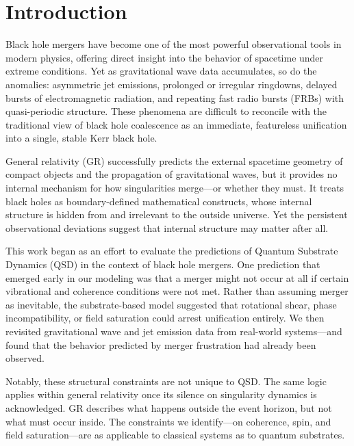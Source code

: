 \documentclass[sn-mathphys]{sn-jnl}
\theoremstyle{thmstyleone}%
\theoremstyle{thmstyletwo}%
\theoremstyle{thmstylethree}%
\begin{document}
\section{Introduction}
Black hole mergers have become one of the most powerful observational tools in modern physics, offering direct insight into the behavior of spacetime under extreme conditions. Yet as gravitational wave data accumulates, so do the anomalies: asymmetric jet emissions, prolonged or irregular ringdowns, delayed bursts of electromagnetic radiation, and repeating fast radio bursts (FRBs) with quasi-periodic structure. These phenomena are difficult to reconcile with the traditional view of black hole coalescence as an immediate, featureless unification into a single, stable Kerr black hole.

General relativity (GR) successfully predicts the external spacetime geometry of compact objects and the propagation of gravitational waves, but it provides no internal mechanism for how singularities merge—or whether they must. It treats black holes as boundary-defined mathematical constructs, whose internal structure is hidden from and irrelevant to the outside universe. Yet the persistent observational deviations suggest that internal structure may matter after all.

This work began as an effort to evaluate the predictions of Quantum Substrate Dynamics (QSD) \cite{bush2025} in the context of black hole mergers. One prediction that emerged early in our modeling was that a merger might not occur at all if certain vibrational and coherence conditions were not met. Rather than assuming merger as inevitable, the substrate-based model suggested that rotational shear, phase incompatibility, or field saturation could arrest unification entirely. We then revisited gravitational wave and jet emission data from real-world systems—and found that the behavior predicted by merger frustration had already been observed.

Notably, these structural constraints are not unique to QSD. The same logic applies within general relativity once its silence on singularity dynamics is acknowledged. GR describes what happens outside the event horizon\cite{Unruh1981}, but not what must occur inside. The constraints we identify—on coherence, spin, and field saturation—are as applicable to classical systems as to quantum substrates.
\end{document}
